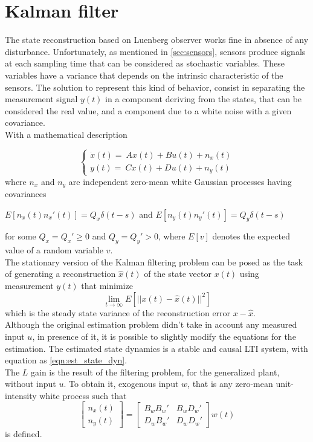 \section{Kalman filter}
\label{sec:Kalman_filter}
The state reconstruction based on Luenberg observer works fine in absence of any disturbance. Unfortunately, as mentioned in \cref{sec:sensors}, sensors produce signals at each sampling time that can be considered as stochastic variables. These variables have a variance that depends on the intrinsic characteristic of the sensors. The solution to represent this kind of behavior, consist in separating the measurement signal $y(t)$ in a component deriving from the states, that can be considered the real value, and a component due to a white noise with a given covariance.  \\

With a mathematical description 

\begin{equation}
	\begin{cases}
		\dot x(t) =\ A x(t) + B u(t) +n_x(t) \\
		y(t) =\ C x(t) + D u(t) + n_y(t)
	\end{cases}
\end{equation}
where $n_x$ and $n_y$ are independent zero-mean white Gaussian processes having covariances
\begin{center}
	$E[n_x(t)n_x'(t)]=Q_x \delta(t-s)$  and $E[n_y(t)n_y'(t)]=Q_y \delta(t-s) $
\end{center}
for some $Q_x = Q_x' \geq 0$ and $Q_y = Q_y' > 0$, where $E[v]$ denotes the expected value of a random variable $v$.\\

The stationary version of the Kalman filtering problem can be posed as the task of generating a reconstruction $\hat x (t)$ of the state vector $x(t)$ using measurement $y(t)$ that minimize 
\begin{equation}
	\lim_{t \to \infty }E[ ||x(t) - \hat x(t) ||^2 ]
\end{equation}
which is the steady state variance of the reconstruction error $ x-\hat x$.\\

Although the original estimation problem didn't take in account any measured input $u$, in presence of it, it is possible to slightly modify the equations for the estimation. 
The estimated state dynamics is a stable and causal LTI system, with equation as \cref{eqn:est_state_dyn}. \\
The $L$ gain is the result of the filtering problem, for the generalized plant, without input $u$.
To obtain it, exogenous input $w$, that is any zero-mean unit-intensity white process such that
\begin{equation}
	\begin{bmatrix}
		n_x(t) \\
		n_y(t)
	\end{bmatrix} = 
	\begin{bmatrix}
		B_wB_w'& B_wD_w'\\
		D_wB_w' & D_wD_w'
	\end{bmatrix} w(t)
\end{equation}
is defined. \\

